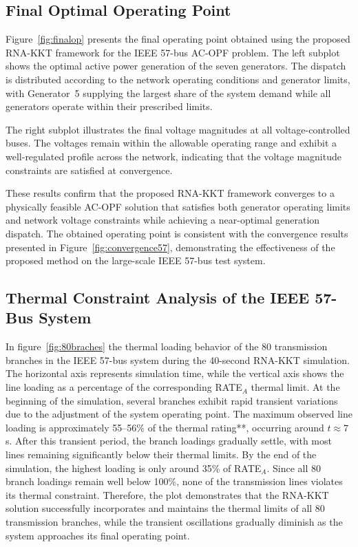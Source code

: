 \documentclass[11pt,onecolumn]{article}
\theoremstyle{definition}
\theoremstyle{remark}
\begin{document}
\subsection{Final Optimal Operating Point}

Figure~\ref{fig:finalop} presents the final operating point obtained
using the proposed RNA-KKT framework for the IEEE 57-bus AC-OPF problem. The
left subplot shows the optimal active power generation of the seven generators.
The dispatch is distributed according to the network operating conditions and
generator limits, with Generator~5 supplying the largest share of the system
demand while all generators operate within their prescribed limits.

The right subplot illustrates the final voltage magnitudes at all
voltage-controlled buses. The voltages remain within the allowable operating
range and exhibit a well-regulated profile across the network, indicating that
the voltage magnitude constraints are satisfied at convergence.

These results confirm that the proposed RNA-KKT framework converges to a
physically feasible AC-OPF solution that satisfies both generator operating
limits and network voltage constraints while achieving a near-optimal
generation dispatch. The obtained operating point is consistent with the
convergence results presented in Figure~\ref{fig:convergence57},
demonstrating the effectiveness of the proposed method on the large-scale IEEE
57-bus test system.


\subsection{ Thermal Constraint Analysis of the IEEE 57-Bus System}

In figure~\ref{fig:80braches} the thermal loading behavior of the 80 transmission branches in the IEEE 57-bus system during the 40-second RNA-KKT simulation. The horizontal axis represents simulation time, while the vertical axis shows the line loading as a percentage of the corresponding RATE\(_A\) thermal limit. At the beginning of the simulation, several branches exhibit rapid transient variations due to the adjustment of the system operating point. The maximum observed line loading is approximately 55–56\% of the thermal rating**, occurring around \(t \approx 7\) s. After this transient period, the branch loadings gradually settle, with most lines remaining significantly below their thermal limits. By the end of the simulation, the highest loading is only around 35\% of RATE\(_A\). Since all 80 branch loadings remain well below 100\%, none of the transmission lines violates its thermal constraint. Therefore, the plot demonstrates that the RNA-KKT solution successfully incorporates and maintains the thermal limits of all 80 transmission branches, while the transient oscillations gradually diminish as the system approaches its final operating point.
\end{document}
